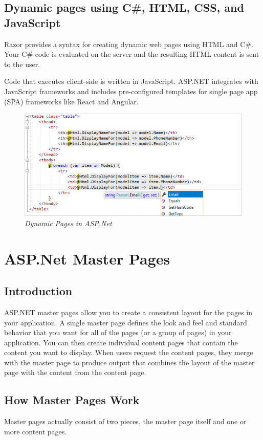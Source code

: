\section{Dynamic pages using C\#, HTML, CSS, and JavaScript}
Razor provides a syntax for creating dynamic web pages using HTML and C\#. Your C\# code is evaluated on the server and the resulting HTML content is sent to the user.

Code that executes client-side is written in JavaScript. ASP.NET integrates with JavaScript frameworks and includes pre-configured templates for single page app (SPA) frameworks like React and Angular.

\begin{figure}[h]
	\centering
	\includegraphics[width=0.85\linewidth]{img/a1}
	\caption{\textit{Dynamic Pages in ASP.Net}}
	\label{fig:asp_dynamic}
\end{figure}


\chapter{ASP.Net Master Pages}

\section{Introduction}
ASP.NET master pages allow you to create a consistent layout for the pages in your application. A single master page defines the look and feel and standard behavior that you want for all of the pages (or a group of pages) in your application. You can then create individual content pages that contain the content you want to display. When users request the content pages, they merge with the master page to produce output that combines the layout of the master page with the content from the content page.

\section{How Master Pages Work}
Master pages actually consist of two pieces, the master page itself and one or more content pages.

